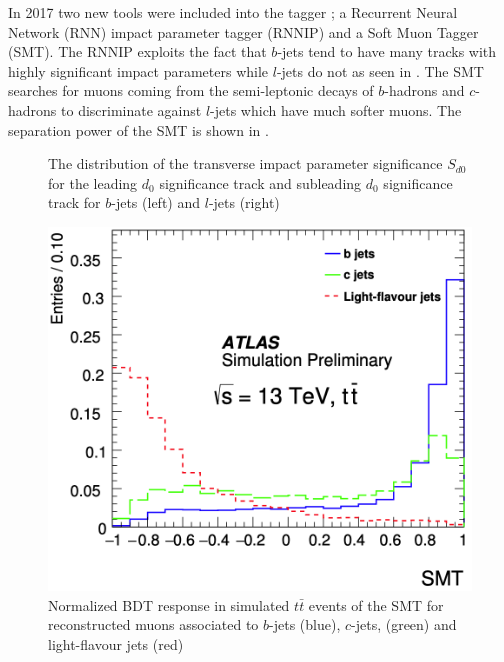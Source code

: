 In 2017 two new tools were included into the tagger
\cite{ATL-PHYS-PUB-2017-013}; a Recurrent Neural Network (RNN) impact parameter
tagger (RNNIP) and a Soft Muon Tagger (SMT).  The RNNIP
\cite{ATL-PHYS-PUB-2017-003} exploits the fact that $b$-jets tend to have many
tracks with highly significant impact parameters while $l$-jets do not
as seen in .  The SMT \cite{Sciandra:2287545} searches
for muons coming from the semi-leptonic decays of $b$-hadrons and $c$-hadrons
to discriminate against $l$-jets which have much softer muons. The separation
power of the SMT is shown in .

\begin{figure}[!htbp]
  \centering
   \hfill

  \caption{\cite{ATL-PHYS-PUB-2017-003} The distribution of the transverse impact parameter significance $S_{d0}$ for the leading $d_{0}$ significance track and subleading $d_{0}$ significance track for $b$-jets (left) and $l$-jets (right)}
  \label{sec:objects:RNNIP}
\end{figure}

\begin{figure}[!htbp]
  \centering
  \includegraphics[width=0.5\linewidth]{figures/objects/SMT}
  \caption{\cite{Sciandra:2287545} Normalized BDT response in simulated $t\bar{t}$ events of the SMT for reconstructed muons associated to $b$-jets (blue), $c$-jets, (green) and light-flavour jets (red)}
  \label{sec:objects:SMT}
\end{figure}

